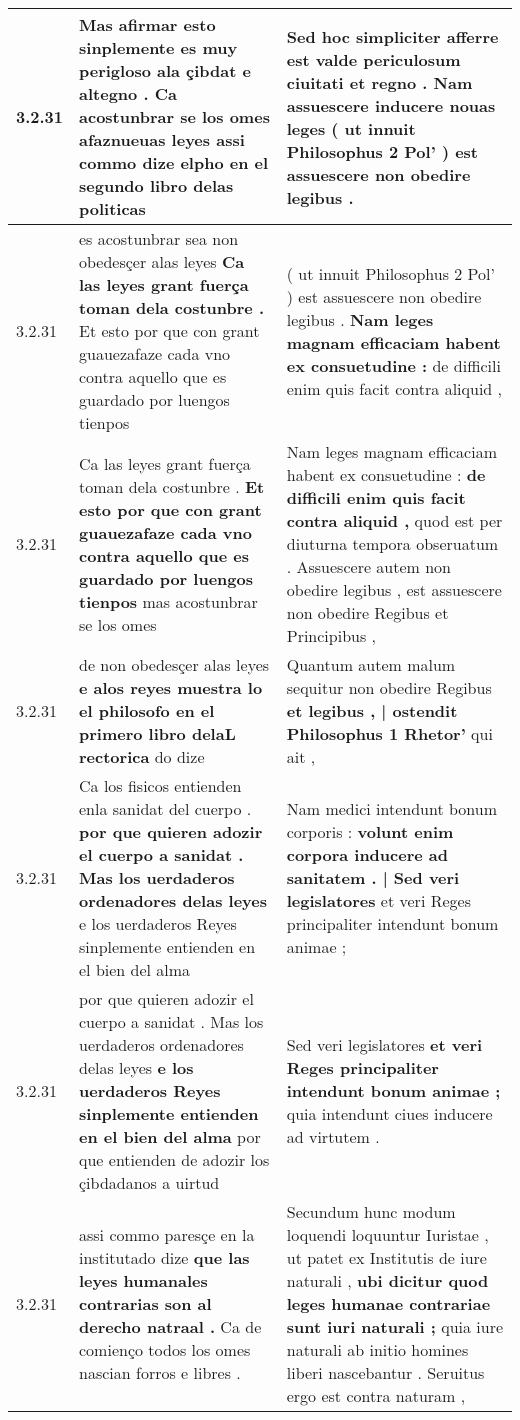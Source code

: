 \begin{tabular}{|p{1cm}|p{6.5cm}|p{6.5cm}|}
3.2.31 & Mas afirmar esto sinplemente es muy perigloso ala çibdat e altegno . \textbf{ Ca acostunbrar se los omes afaznueuas leyes } assi commo dize elpho en el segundo libro delas politicas & Sed hoc simpliciter afferre est valde periculosum ciuitati et regno . \textbf{ Nam assuescere inducere nouas leges } ( ut innuit Philosophus 2 Pol’ ) est assuescere non obedire legibus . \\\hline
3.2.31 & es acostunbrar sea non obedesçer alas leyes \textbf{ Ca las leyes grant fuerça toman dela costunbre . } Et esto por que con grant guauezafaze cada vno contra aquello que es guardado por luengos tienpos & ( ut innuit Philosophus 2 Pol’ ) est assuescere non obedire legibus . \textbf{ Nam leges magnam efficaciam habent ex consuetudine : } de difficili enim quis facit contra aliquid , \\\hline
3.2.31 & Ca las leyes grant fuerça toman dela costunbre . \textbf{ Et esto por que con grant guauezafaze cada vno contra aquello que es guardado por luengos tienpos } mas acostunbrar se los omes & Nam leges magnam efficaciam habent ex consuetudine : \textbf{ de difficili enim quis facit contra aliquid , } quod est per diuturna tempora obseruatum . Assuescere autem non obedire legibus , est assuescere non obedire Regibus et Principibus , \\\hline
3.2.31 & de non obedesçer alas leyes \textbf{ e alos reyes muestra lo el philosofo en el primero libro delaL rectorica } do dize & Quantum autem malum sequitur non obedire Regibus \textbf{ et legibus , | ostendit Philosophus 1 Rhetor’ } qui ait , \\\hline
3.2.31 & Ca los fisicos entienden enla sanidat del cuerpo . \textbf{ por que quieren adozir el cuerpo a sanidat . Mas los uerdaderos ordenadores delas leyes } e los uerdaderos Reyes sinplemente entienden en el bien del alma & Nam medici intendunt bonum corporis : \textbf{ volunt enim corpora inducere ad sanitatem . | Sed veri legislatores } et veri Reges principaliter intendunt bonum animae ; \\\hline
3.2.31 & por que quieren adozir el cuerpo a sanidat . Mas los uerdaderos ordenadores delas leyes \textbf{ e los uerdaderos Reyes sinplemente entienden en el bien del alma } por que entienden de adozir los çibdadanos a uirtud & Sed veri legislatores \textbf{ et veri Reges principaliter intendunt bonum animae ; } quia intendunt ciues inducere ad virtutem . \\\hline
3.2.31 & assi commo paresçe en la institutado dize \textbf{ que las leyes humanales contrarias son al derecho natraal . } Ca de comienço todos los omes nascian forros e libres . & Secundum hunc modum loquendi loquuntur Iuristae , ut patet ex Institutis de iure naturali , \textbf{ ubi dicitur quod leges humanae contrariae sunt iuri naturali ; } quia iure naturali ab initio homines liberi nascebantur . Seruitus ergo est contra naturam , \\\hline

\end{tabular}
